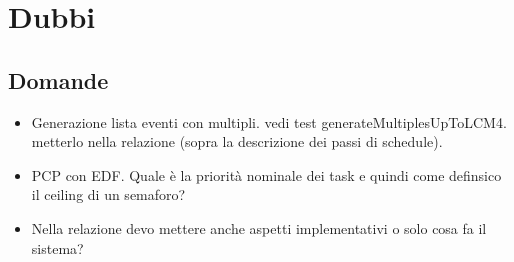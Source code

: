 \chapter{Dubbi}

\section{Domande}
\begin{itemize}
    \item Generazione lista eventi con multipli. vedi test generateMultiplesUpToLCM4. metterlo nella relazione (sopra la descrizione dei passi di schedule).
    \item PCP con EDF. Quale è la priorità nominale dei task e quindi come definsico il ceiling di un semaforo?
    \item Nella relazione devo mettere anche aspetti implementativi o solo cosa fa il sistema?
\end{itemize}